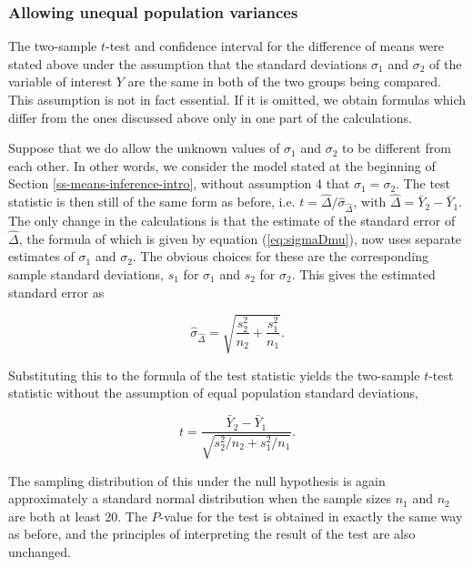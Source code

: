 \documentclass[11pt,a4paper,openany]{book}
\begin{document}
\subsubsection*{Allowing unequal population
variances}\label{allowing-unequal-population-variances}

The two-sample \(t\)-test and confidence interval for the difference of
means were stated above under the assumption that the standard
deviations \(\sigma_{1}\) and \(\sigma_{2}\) of the variable of interest
\(Y\) are the same in both of the two groups being compared. This
assumption is not in fact essential. If it is omitted, we obtain
formulas which differ from the ones discussed above only in one part of
the calculations.

Suppose that we do allow the unknown values of \(\sigma_{1}\) and
\(\sigma_{2}\) to be different from each other. In other words, we
consider the model stated at the beginning of Section
\ref{ss-means-inference-intro}, without assumption 4 that
\(\sigma_{1}=\sigma_{2}\). The test statistic is then still of the same
form as before, i.e. \(t=\hat{\Delta}/\hat{\sigma}_{\hat{\Delta}}\),
with \(\hat{\Delta}=\bar{Y}_{2}-\bar{Y}_{1}\). The only change in the
calculations is that the estimate of the standard error of
\(\hat{\Delta}\), the formula of which is given by equation
(\ref{eq:sigmaDmu}), now uses separate estimates of \(\sigma_{1}\) and
\(\sigma_{2}\). The obvious choices for these are the corresponding
sample standard deviations, \(s_{1}\) for \(\sigma_{1}\) and \(s_{2}\)
for \(\sigma_{2}\). This gives the estimated standard error as

\begin{equation}\hat{\sigma}_{\hat{\Delta}}=
\sqrt{
\frac{s_{2}^{2}}{n_{2}}+
\frac{s_{1}^{2}}{n_{1}}
}.
\label{eq:seDmu-ne}\end{equation}

Substituting this to the formula of the test statistic yields the
two-sample \(t\)-test statistic without the assumption of equal
population standard deviations,

\begin{equation}t=
\frac{\bar{Y}_{2}-\bar{Y}_{1}}
{\sqrt{s^{2}_{2}/n_{2}+s^{2}_{1}/n_{1}}}.
\label{eq:ztestmuD}\end{equation}

The sampling distribution of this under the null hypothesis is again
approximately a standard normal distribution when the sample sizes
\(n_{1}\) and \(n_{2}\) are both at least 20. The \(P\)-value for the
test is obtained in exactly the same way as before, and the principles
of interpreting the result of the test are also unchanged.
\end{document}
